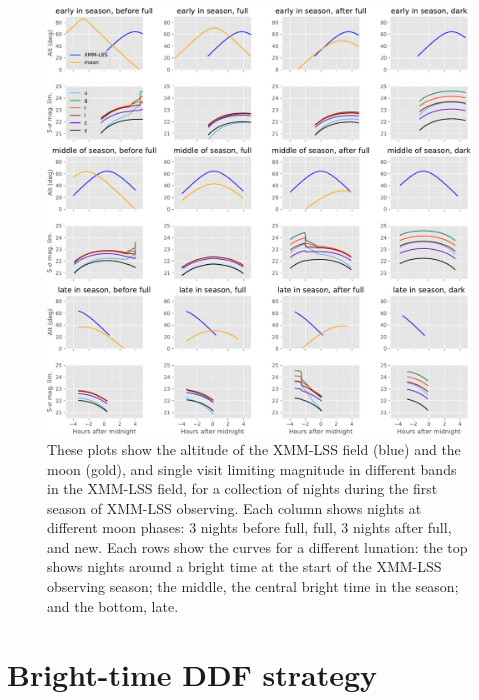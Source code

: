 \documentclass[DM,authoryear,toc]{lsstdoc}
\begin{document}
\begin{figure}
\centering
\includegraphics[width=\linewidth]{figures/m5_alt_xmmlss.pdf}
\caption{\label{fig:m5alt}
  These plots show the altitude of the XMM-LSS field (blue) and the moon (gold), and single visit limiting magnitude in different bands in the XMM-LSS field, for a collection of nights during the first season of XMM-LSS observing.
  Each column shows nights at different moon phases: 3 nights before full, full, 3 nights after full, and new.
  Each rows show the curves for a different lunation: the top shows nights around a bright time at the start of the XMM-LSS observing season; the middle, the central bright time in the season; and the bottom, late.
}
\end{figure}

\section{Bright-time DDF strategy}
\end{document}
